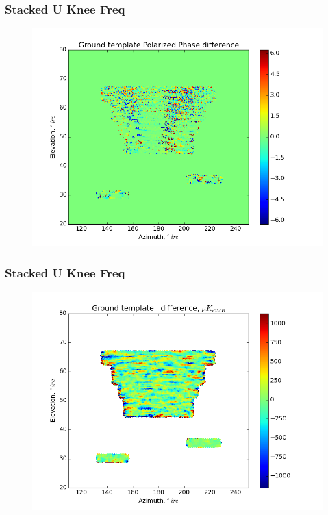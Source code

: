 \documentclass{beamer}
\begin{document}
\begin{frame}
\frametitle{Stacked U Knee Freq}
\begin{figure}
\includegraphics[width=0.9\linewidth]{dArg_gt_STACK_U_FKNEE.png}
\end{figure}
\end{frame}

\begin{frame}
\frametitle{Stacked U Knee Freq}
\begin{figure}
\includegraphics[width=0.9\linewidth]{dI_gt_STACK_U_FKNEE.png}
\end{figure}
\end{frame}
\end{document}

